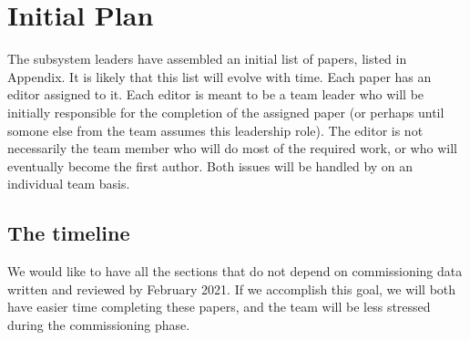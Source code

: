  
\section{Initial Plan} 

The subsystem leaders have assembled an initial list of papers, listed in Appendix. 
It is likely that this list will evolve with time. 
Each paper has an editor assigned to it. Each editor is meant to be a team leader
who will be initially responsible for the completion of the assigned paper (or perhaps 
until somone else from the team assumes this leadership role). The editor is not 
necessarily the team member who will do most of the required work, or who will 
eventually become the first author. Both issues will be handled by on an individual team basis. 

\subsection{The timeline} 

We would like to have all the sections that do not depend on commissioning data 
written and reviewed by February 2021. If we accomplish this goal, we will both
have easier time completing these papers, and the team will be less stressed during
the commissioning phase. 

